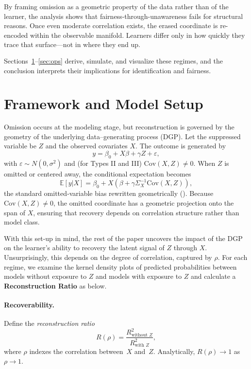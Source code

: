 \documentclass[11pt]{article}
\begin{document}
By framing omission as a geometric property of the data rather than of the learner,
the analysis shows that fairness-through-unawareness fails for structural reasons.
Once even moderate correlation exists, the erased coordinate is re-encoded within the observable manifold.
Learners differ only in how quickly they trace that surface—not in where they end up.

Sections~\ref{sec:framework}--\ref{sec:ops}
derive, simulate, and visualize these regimes,
and the conclusion interprets their implications for identification and fairness.

\section{Framework and Model Setup}
\label{sec:framework}

Omission occurs at the modeling stage, but reconstruction is governed by the geometry of the underlying data–generating process (DGP).
Let the suppressed variable be $Z$ and the observed covariates $X$.
The outcome is generated by
\begin{equation}
  y = \beta_0 + X\beta + \gamma Z + \varepsilon,
  \label{eq:dgp}
\end{equation}
with $\varepsilon\!\sim\!N(0,\sigma^2)$ and (for Types II and III) $\mathrm{Cov}(X,Z)\neq0$.
When $Z$ is omitted or centered away,
the conditional expectation becomes
\begin{equation}
  \mathbb{E}[y|X] = \beta_0 + X\!\left(\beta + \gamma \Sigma_X^{-1}\mathrm{Cov}(X,Z)\right),
  \label{eq:bias}
\end{equation}
the standard omitted‐variable bias rewritten geometrically
(\citealp{greenland1999confounding, imbens2015causal}).
Because $\mathrm{Cov}(X,Z)\neq0$, the omitted coordinate has a geometric projection onto the span of $X$, ensuring that recovery depends on correlation structure rather than model class.

With this set-up in mind, the rest of the paper uncovers the impact of the DGP on the learner's ability to recovery the latent signal of $Z$ through $X$. Unsurprisingly, this depends on the degree of correlation, captured by $\rho$. For each regime, we examine the kernel density plots of predicted probabilities between models without exposure to $Z$ and models with exposure to $Z$ and calculate a \textbf{Reconstruction Ratio} as below. 

\paragraph{Recoverability.}
Define the \emph{reconstruction ratio}
\begin{equation}
  R(\rho) = \frac{R^2_{\text{without }Z}}{R^2_{\text{with }Z}},
\label{eq:reconstruction_ratio}
\end{equation}
where $\rho$ indexes the correlation between~$X$ and~$Z$.
Analytically, $R(\rho)\!\to\!1$ as $\rho\!\to\!1$.
\end{document}
